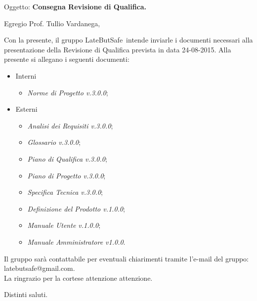 \documentclass{letter}
\makeatletter
\newcommand{\DefinizioneDelProdotto}{\textit{Definizione del Prodotto v.1.0.0}}
\newcommand{\SpecificaTecnica}{\textit{Specifica Tecnica v.3.0.0}}
\newcommand{\AnalisiDeiRequisiti}{\textit{Analisi dei Requisiti v.3.0.0}}
\newcommand{\PianoDiProgetto}{\textit{Piano di Progetto v.3.0.0}}
\newcommand{\NormeDiProgetto}{\textit{Norme di Progetto v.3.0.0}}
\newcommand{\PianoDiQualifica}{\textit{Piano di Qualifica v.3.0.0}}
\newcommand{\ManualeUtente}{\textit{Manuale Utente v.1.0.0}}
\newcommand{\ManualeAmministratore}{\textit{Manuale Amministratore v1.0.0}}
\newcommand{\Glossario}{\textit{Glossario v.3.0.0}}
\newcommand{\gruppo}{LateButSafe}
\newcommand{\mail}{latebutsafe@gmail.com}
\newcommand{\Vardanega}{Prof. Tullio Vardanega}
\makeatother
\begin{document}
	
	\begin{letter}{Oggetto: \textbf{Consegna Revisione di Qualifica.}}
	\opening {Egregio \Vardanega ,}
	Con la presente, il gruppo \gruppo\ intende inviarle i documenti necessari alla presentazione della Revisione di Qualifica prevista in data 24-08-2015.
	Alla presente si allegano i seguenti documenti:
			\begin{itemize}
				\item Interni
					\begin{itemize}
						\item \NormeDiProgetto;
					\end{itemize}
				\item Esterni
					\begin{itemize}
						\item \AnalisiDeiRequisiti;
						\item \Glossario;
						\item \PianoDiQualifica;
						\item \PianoDiProgetto;
						\item \SpecificaTecnica;
						\item \DefinizioneDelProdotto;
						\item \ManualeUtente;
						\item \ManualeAmministratore.
					\end{itemize}
			\end{itemize} 
		Il gruppo sarà  contattabile per eventuali chiarimenti tramite l'e-mail del gruppo: \mail.	\\
		La ringrazio per la cortese attenzione attenzione.
		
		\thispagestyle{fancy}
		\closing{Distinti saluti.}
		\signature{Manuel Fossa\\
					Responsabile di Progetto\\
					\gruppo}
   \end{letter}
\end{document}
